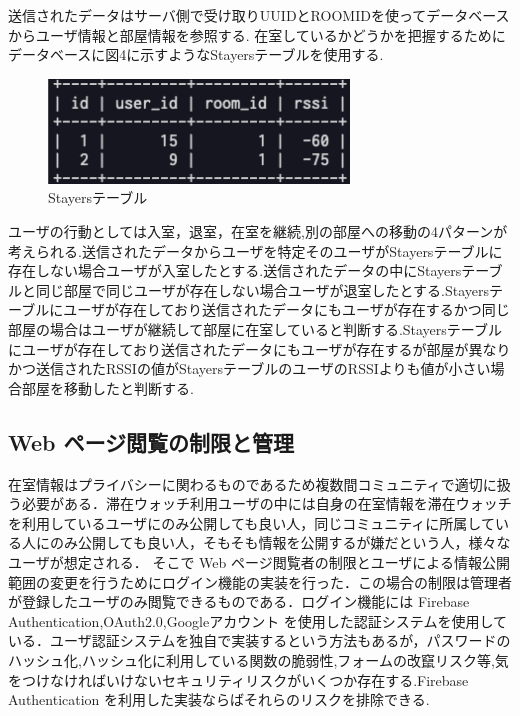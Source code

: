 \documentclass[a4j,8pt,twocolumn]{extarticle}
\begin{document}
送信されたデータはサーバ側で受け取りUUIDとROOMIDを使ってデータベースからユーザ情報と部屋情報を参照する.
在室しているかどうかを把握するためにデータベースに図4に示すようなStayersテーブルを使用する.
\begin{figure}[tbh]
    \centering
    \includegraphics[width=8cm]{stayers.jpg}
    \caption{Stayersテーブル}
    \label{multipleBPM}
\end{figure}
ユーザの行動としては入室，退室，在室を継続,別の部屋への移動の4パターンが考えられる.送信されたデータからユーザを特定そのユーザがStayersテーブルに存在しない場合ユーザが入室したとする.送信されたデータの中にStayersテーブルと同じ部屋で同じユーザが存在しない場合ユーザが退室したとする.Stayersテーブルにユーザが存在しており送信されたデータにもユーザが存在するかつ同じ部屋の場合はユーザが継続して部屋に在室していると判断する.Stayersテーブルにユーザが存在しており送信されたデータにもユーザが存在するが部屋が異なりかつ送信されたRSSIの値がStayersテーブルのユーザのRSSIよりも値が小さい場合部屋を移動したと判断する.


\subsection{Web ページ閲覧の制限と管理}
 在室情報はプライバシーに関わるものであるため複数間コミュニティで適切に扱う必要がある．滞在ウォッチ利用ユーザの中には自身の在室情報を滞在ウォッチを利用しているユーザにのみ公開しても良い人，同じコミュニティに所属している人にのみ公開しても良い人，そもそも情報を公開するが嫌だという人，様々なユーザが想定される．
 そこで Web ページ閲覧者の制限とユーザによる情報公開範囲の変更を行うためにログイン機能の実装を行った．この場合の制限は管理者が登録したユーザのみ閲覧できるものである．ログイン機能には Firebase Authentication,OAuth2.0,Googleアカウント を使用した認証システムを使用している．ユーザ認証システムを独自で実装するという方法もあるが，パスワードのハッシュ化,ハッシュ化に利用している関数の脆弱性,フォームの改竄リスク等,気をつけなければいけないセキュリティリスクがいくつか存在する.Firebase Authentication を利用した実装ならばそれらのリスクを排除できる.
\end{document}
